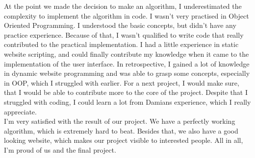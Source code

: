 At the point we made the decision to make an algorithm, I underestimated the complexity to implement the algorithm in code. I wasn't very practised in Object Oriented Programming. I understood the basic concepts, but didn't have any practice experience. Because of that, I wasn't qualified to write code that really contributed to the practical implementation.
I had a little experience in static website scripting, and could finally contribute my knowledge when it came to the implementation of the user interface. In retrospective, I gained a lot of knowledge in dynamic website programming and was able to grasp some concepts, especially in OOP, which I struggled with earlier. 
For a next project, I would make sure, that I would be able to contribute more to the  core of the project.
Despite that I struggled with coding, I could learn a lot from Damians experience, which I really appreciate.\\

I'm very satisfied with the result of our project. We have a perfectly working algorithm, which is extremely hard to beat. Besides that, we also have a good looking website, which makes our project visible to interested people. All in all, I'm proud of us and the final project.






















